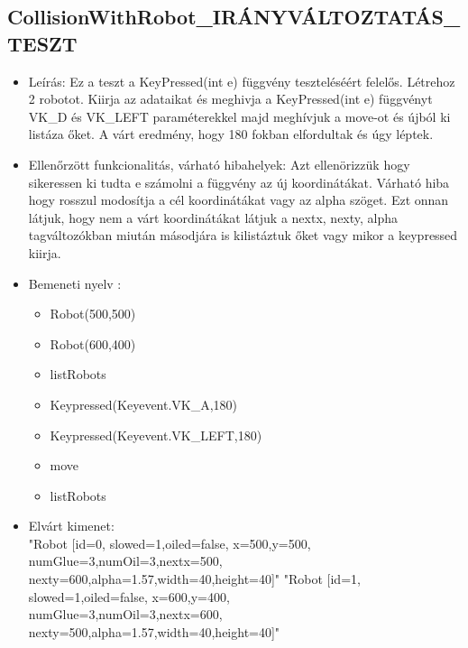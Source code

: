 \subsection{CollisionWithRobot\_IRÁNYVÁLTOZTATÁS\_TESZT}
\begin{itemize}
	\item Leírás: Ez a teszt a KeyPressed(int e) függvény teszteléséért felelős.
			Létrehoz 2 robotot.
			Kiirja az adataikat  és meghivja a KeyPressed(int e)  függvényt VK\_D és VK\_LEFT paraméterekkel majd meghívjuk a move-ot és újból ki listáza őket. A várt eredmény, hogy 180 fokban elfordultak és úgy léptek.			\newline
	\item Ellenőrzött funkcionalitás, várható hibahelyek: Azt ellenörizzük hogy sikeressen ki tudta e számolni a függvény az új koordinátákat.
		Várható hiba hogy rosszul modosítja a cél koordinátákat vagy az alpha szöget. 
		Ezt onnan látjuk, hogy nem a várt koordinátákat látjuk a nextx, nexty, alpha tagváltozókban miután másodjára is kilistáztuk őket vagy mikor a keypressed kiirja.
	\item Bemeneti nyelv :
		\begin{itemize}
		\item Robot(500,500)
		\item Robot(600,400)
		\item listRobots
		\item Keypressed(Keyevent.VK\_A,180)
		\item Keypressed(Keyevent.VK\_LEFT,180)
		\item move
		\item listRobots
		\end{itemize}
	
	\item Elvárt kimenet: \\
		"Robot [id=0,  slowed=1,oiled=false, x=500,y=500, 
		\\numGlue=3,numOil=3,nextx=500,
		\\nexty=600,alpha=1.57,width=40,height=40]"\newline
		"Robot [id=1,  slowed=1,oiled=false, x=600,y=400, 
		\\numGlue=3,numOil=3,nextx=600,
		\\nexty=500,alpha=1.57,width=40,height=40]"\newline
		

\end{itemize}
